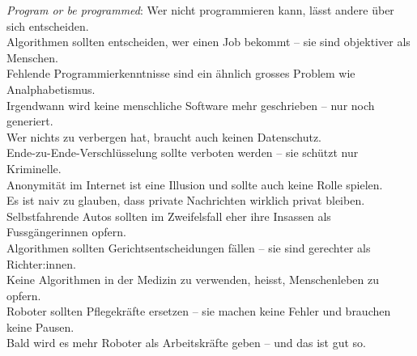 
\huge
{}
\thispagestyle{empty}
\begin{landscape}
    \textit{Program or be programmed}: Wer nicht programmieren kann, lässt andere über sich entscheiden.\\[20pt]

    Algorithmen sollten entscheiden, wer einen Job bekommt -- sie sind objektiver als Menschen.\\[20pt]

    Fehlende Programmierkenntnisse sind ein ähnlich grosses Problem wie Analphabetismus.\\[20pt]

    Irgendwann wird keine menschliche Software mehr geschrieben -- nur noch generiert.\\[20pt]

    Wer nichts zu verbergen hat, braucht auch keinen Datenschutz.\\[20pt]

    Ende-zu-Ende-Verschlüsselung sollte verboten werden -- sie schützt nur Kriminelle.\\[20pt]

    Anonymität im Internet ist eine Illusion und sollte auch keine Rolle spielen.\\[20pt]

    Es ist naiv zu glauben, dass private Nachrichten wirklich privat bleiben.\\[20pt]

    Selbstfahrende Autos sollten im Zweifelsfall eher ihre Insassen als Fussgängerinnen opfern.\\[20pt]

    Algorithmen sollten Gerichtsentscheidungen fällen -- sie sind gerechter als Richter:innen.\\[20pt]

    Keine Algorithmen in der Medizin zu verwenden, heisst, Menschenleben zu opfern.\\[20pt]

    Roboter sollten Pflegekräfte ersetzen -- sie machen keine Fehler und brauchen keine Pausen.\\[20pt]

    Bald wird es mehr Roboter als Arbeitskräfte geben -- und das ist gut so.\\[20pt]



\end{landscape}

